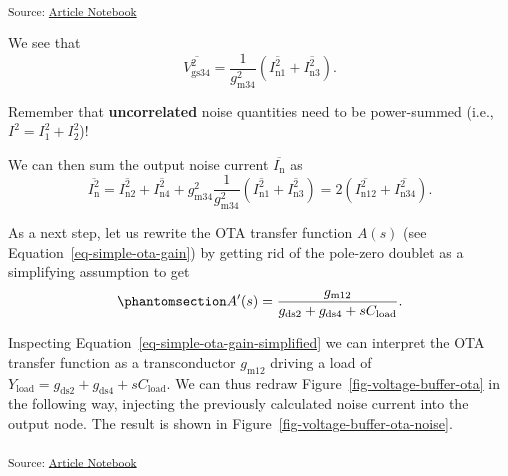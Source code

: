 \documentclass[
  a4paper,
  DIV=11,
  numbers=noendperiod]{scrartcl}
\begin{document}
\textsubscript{Source:
\href{https://iic-jku.github.io/analog-circuit-design/index.qmd.html}{Article
Notebook}}

We see that \[
\overline{V_\mathrm{gs34}^2} = \frac{1}{g_\mathrm{m34}^2} \left( \overline{I_\mathrm{n1}^2} + \overline{I_\mathrm{n3}^2} \right).
\]

\begin{tcolorbox}[enhanced jigsaw, titlerule=0mm, left=2mm, coltitle=black, toprule=.15mm, breakable, opacitybacktitle=0.6, colframe=quarto-callout-important-color-frame, bottomtitle=1mm, toptitle=1mm, opacityback=0, colbacktitle=quarto-callout-important-color!10!white, title=\textcolor{quarto-callout-important-color}{\faExclamation}\hspace{0.5em}{Noise Addition}, arc=.35mm, rightrule=.15mm, colback=white, bottomrule=.15mm, leftrule=.75mm]

Remember that \textbf{uncorrelated} noise quantities need to be
power-summed (i.e., \(I^2 = I_1^2 + I_2^2\))!

\end{tcolorbox}

We can then sum the output noise current \(\overline{I_\mathrm{n}}\) as
\[
\overline{I_\mathrm{n}^2} = \overline{I_\mathrm{n2}^2} + \overline{I_\mathrm{n4}^2} + g_\mathrm{m34}^2 \frac{1}{g_\mathrm{m34}^2} \left( \overline{I_\mathrm{n1}^2} + \overline{I_\mathrm{n3}^2} \right) = 2 \left( \overline{I_\mathrm{n12}^2} + \overline{I_\mathrm{n34}^2} \right).
\]

As a next step, let us rewrite the OTA transfer function \(A(s)\) (see
Equation~\ref{eq-simple-ota-gain}) by getting rid of the pole-zero
doublet as a simplifying assumption to get
\begin{equation}\phantomsection\label{eq-simple-ota-gain-simplified}{
A'(s) = \frac{g_\mathrm{m12}}{g_\mathrm{ds2} + g_\mathrm{ds4} + s C_\mathrm{load}}.
}\end{equation}

Inspecting Equation~\ref{eq-simple-ota-gain-simplified} we can interpret
the OTA transfer function as a transconductor \(g_\mathrm{m12}\) driving
a load of
\(Y_\mathrm{load} = g_\mathrm{ds2} + g_\mathrm{ds4} + s C_\mathrm{load}\).
We can thus redraw Figure~\ref{fig-voltage-buffer-ota} in the following
way, injecting the previously calculated noise current into the output
node. The result is shown in Figure~\ref{fig-voltage-buffer-ota-noise}.

\textsubscript{Source:
\href{https://iic-jku.github.io/analog-circuit-design/index.qmd.html}{Article
Notebook}}
\end{document}
